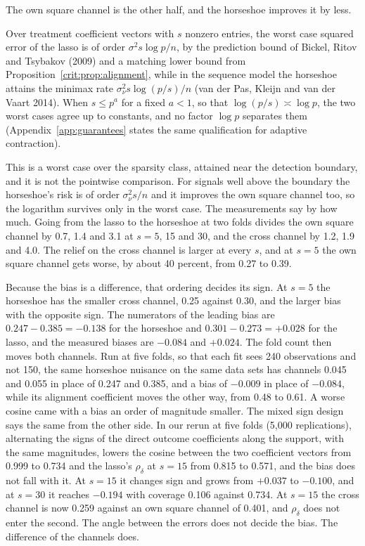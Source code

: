 The own square channel is the other half, and the horseshoe improves it by less.

\begin{remark}\label{crit:prop:own}
Over treatment coefficient vectors with $s$ nonzero entries, the worst case squared error of the lasso is of order $\sigma^2 s\log p/n$, by the prediction bound of Bickel, Ritov and Tsybakov (2009) and a matching lower bound from Proposition~\ref{crit:prop:alignment}, while in the sequence model the horseshoe attains the minimax rate $\sigma_\nu^2 s\log(p/s)/n$ (van der Pas, Kleijn and van der Vaart 2014). When $s \le p^a$ for a fixed $a < 1$, so that $\log(p/s) \asymp \log p$, the two worst cases agree up to constants, and no factor $\log p$ separates them (Appendix~\ref{app:guarantees} states the same qualification for adaptive contraction).
\end{remark}

This is a worst case over the sparsity class, attained near the detection boundary, and it is not the pointwise comparison. For signals well above the boundary the horseshoe's risk is of order $\sigma_\nu^2 s/n$ and it improves the own square channel too, so the logarithm survives only in the worst case. The measurements say by how much. Going from the lasso to the horseshoe at two folds divides the own square channel by 0.7, 1.4 and 3.1 at $s = 5$, 15 and 30, and the cross channel by 1.2, 1.9 and 4.0. The relief on the cross channel is larger at every $s$, and at $s = 5$ the own square channel gets worse, by about 40 percent, from 0.27 to 0.39.

Because the bias is a difference, that ordering decides its sign. At $s = 5$ the horseshoe has the smaller cross channel, 0.25 against 0.30, and the larger bias with the opposite sign. The numerators of the leading bias are $0.247 - 0.385 = -0.138$ for the horseshoe and $0.301 - 0.273 = +0.028$ for the lasso, and the measured biases are $-0.084$ and $+0.024$. The fold count then moves both channels. Run at five folds, so that each fit sees 240 observations and not 150, the same horseshoe nuisance on the same data sets has channels 0.045 and 0.055 in place of 0.247 and 0.385, and a bias of $-0.009$ in place of $-0.084$, while its alignment coefficient moves the other way, from 0.48 to 0.61. A worse cosine came with a bias an order of magnitude smaller. The mixed sign design says the same from the other side. In our rerun at five folds (5,000 replications), alternating the signs of the direct outcome coefficients along the support, with the same magnitudes, lowers the cosine between the two coefficient vectors from 0.999 to 0.734 and the lasso's $\rho_\delta$ at $s = 15$ from 0.815 to 0.571, and the bias does not fall with it. At $s = 15$ it changes sign and grows from $+0.037$ to $-0.100$, and at $s = 30$ it reaches $-0.194$ with coverage 0.106 against 0.734. At $s = 15$ the cross channel is now 0.259 against an own square channel of 0.401, and $\rho_\delta$ does not enter the second. The angle between the errors does not decide the bias. The difference of the channels does.

